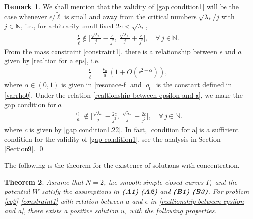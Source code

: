\documentclass[10pt, reqno]{amsart}
\numberwithin{equation}{section}
\newtheorem{theorem}{Theorem}[section]
\theoremstyle{definition}
\newtheorem{remark}[theorem]{Remark}
\begin{document}
{\begin{remark}
{We shall mention that the validity of \eqref{gap condition1} will be the case whenever ${\epsilon}/{{\tilde\ell}}$ is small and away from the critical numbers ${\sqrt{\lambda_*}}/j$ with $j \in {\mathbb N}$, i.e.,
for arbitrarily small fixed $2c<\sqrt{\lambda_*}$,
\begin{align}
\label{gap condition1.22}
\frac{\epsilon}{{\tilde\ell}} \notin \Bigg[ \frac{\sqrt{\lambda_*}} {j}-\frac{c} {j^2}, \ \frac{\sqrt{\lambda_*}} {j}+\frac{c} {j^2} \Bigg],
\quad \forall\,j \in {\mathbb N}.
\end{align}
From the mass constraint \eqref{constraint1}, there is a relationship between
$\epsilon$ and $a$
given by \eqref{realtion for a eps}, i.e.
\begin{align} \label{realtionship between epsilon and a}
\frac\epsilon{\tilde \ell} = \frac{\varrho_0}{a} \left(1+ O\left(\epsilon^{2-\alpha}\right) \right),
\end{align}
where $\alpha\in (0,1)$ is given in \eqref{resonace-f} and $\varrho_0$ is the constant defined in \eqref{varrho0}.
Under the relation \eqref{realtionship between epsilon and a}, we make the gap condition for $a$
\begin{align}
\label{condition for a}
\frac{\varrho_0}{a}\notin \Bigg[ \frac{\sqrt{\lambda_*}}{j}-\frac{2c}{j^{2}}, \ \frac{\sqrt{\lambda_*}}{j}+\frac{2c} {j^2} \Bigg],
\quad \forall\,j \in \mathbb N.
\end{align}
where $c$ is given by \eqref{gap condition1.22}.
In fact, \eqref{condition for a} is a sufficient condition for the validity of \eqref{gap condition1}, see the analysis in Section \ref{Section9}.
\qed
}
\end{remark}



\smallskip
The following is the theorem for the existence of solutions with concentration.

\begin{theorem}
\label{theorem 1.1}
Assume that $N=2$, the smooth simple closed curves $\Gamma_\epsilon$ and the potential $W$ satisfy the assumptions in
{\bf{(A1)}}-{\bf{(A2)}} and {\bf{(B1)}}-{\bf{(B3)}}.
For problem \eqref{eq2}-\eqref{constraint1} with relation between $a$ and $\epsilon $ in \eqref{realtionship between epsilon and a}, there exists a positive solution $u_{\epsilon}$ with the following properties.


\end{theorem}}
\end{document}
